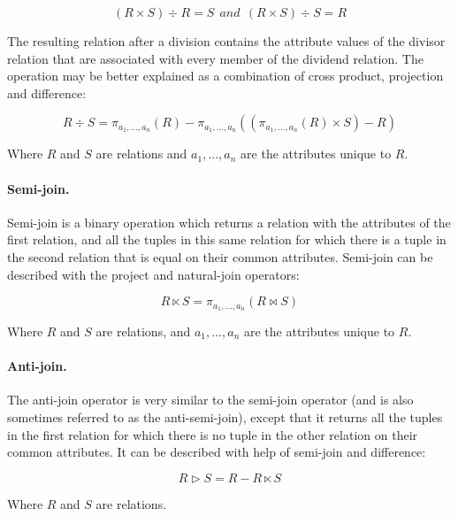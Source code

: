 \begin{equation*}
(R \times S) \div R = S ~~and~~ (R \times S) \div S = R
\end{equation*}

The resulting relation after a division contains the attribute values of the divisor relation that are associated
with every member of the dividend relation\cite{makeDiv}. The operation may be better explained as a
combination of cross product, projection and difference:

\begin{equation*}
R \div S = \pi _{a_{1},...,a_{n}}(R) - \pi _{a_{1},...,a_{n}}((\pi _{a_{1},...,a_{n}}(R) \times S) - R)
\end{equation*}

Where $R$ and $S$ are relations and $a_{1},...,a_{n}$ are the attributes unique to $R$.

\paragraph{Semi-join.}
\label{sect:theory:relAlg:semiJoin}
Semi-join is a binary operation which returns a relation with the attributes of the first relation, and all the
tuples in this same relation for which there is a tuple in the second relation that is equal on their common
attributes. Semi-join can be described with the project and natural-join operators:

\begin{equation*}
R \ltimes S = \pi _{a_{1},...,a_{n}}(R \bowtie S)
\end{equation*}

Where $R$ and $S$ are relations, and $a_{1},...,a_{n}$ are the attributes unique to $R$.

\paragraph{Anti-join.}
\label{sect:theory:relAlg:antiJoin}
The anti-join operator is very similar to the semi-join operator (and is also sometimes referred to as the
anti-semi-join), except that it returns all the tuples in the first relation for which there is no tuple in the
other relation on their common attributes. It can be described with help of semi-join and difference:

\begin{equation*}
R \rhd S = R - R \ltimes S
\end{equation*}

Where $R$ and $S$ are relations.


